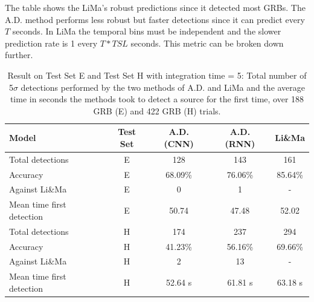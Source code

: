 The table shows the LiMa's robust predictions since it detected most GRBs. The A.D. method performs less robust but faster detections since it can predict every $T$ seconds. In LiMa the temporal bins must be independent and the slower prediction rate is 1  every $T*TSL$ seconds. This metric can be broken down further.


\begin{table}[ht]
\centering %
\begin{tabular}{l c c c c} %
\hline\hline %
Model & Test Set & A.D. (CNN) & A.D. (RNN) & Li\&Ma \\ [0.5ex] %
\hline %
Total detections & E & 128 & 143 & 161 \\ 
Accuracy & E &  68.09\% & 76.06\% & 85.64\%  \\ 
Against Li\&Ma & E &  0 & 1 & - \\ 
Mean time first detection & E &  50.74 & 47.48 & 52.02  \\ [1ex] %

\hline %
Total detections & H &  174 & 237 & 294 \\
Accuracy & H & 41.23\% & 56.16\% & 69.66\%  \\ 
Against Li\&Ma & H & 2 & 13 & - \\  
Mean time first detection & H & 52.64 s & 61.81 s & 63.18 s \\ [1ex]   

\hline %
\end{tabular}
\caption{Result on Test Set E and Test Set H with integration time = 5: Total number of 5$\sigma$ detections performed by the two methods of A.D. and LiMa and the average time in seconds the methods took to detect a source for the first time, over 188 GRB (E) and 422 GRB (H) trials.}
\label{tab:Experiment-Results-E-IT-5} 
\end{table}



